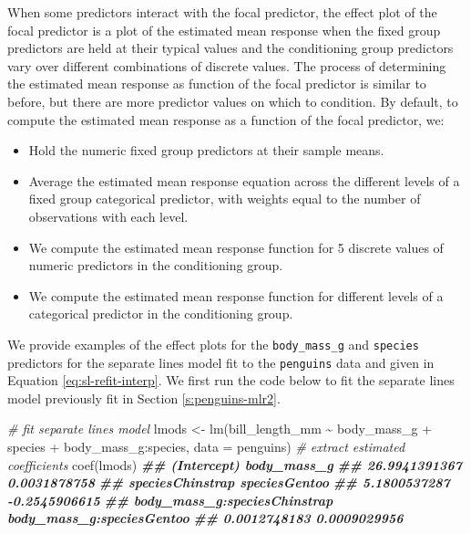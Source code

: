 \documentclass[
]{book}
\newenvironment{Shaded}{\begin{snugshade}}{\end{snugshade}}
\newcommand{\AttributeTok}[1]{\textcolor[rgb]{0.77,0.63,0.00}{#1}}
\newcommand{\CommentTok}[1]{\textcolor[rgb]{0.56,0.35,0.01}{\textit{#1}}}
\newcommand{\DocumentationTok}[1]{\textcolor[rgb]{0.56,0.35,0.01}{\textbf{\textit{#1}}}}
\newcommand{\FunctionTok}[1]{\textcolor[rgb]{0.00,0.00,0.00}{#1}}
\newcommand{\NormalTok}[1]{#1}
\newcommand{\OtherTok}[1]{\textcolor[rgb]{0.56,0.35,0.01}{#1}}
\newcommand{\SpecialCharTok}[1]{\textcolor[rgb]{0.00,0.00,0.00}{#1}}
\providecommand{\tightlist}{%
  \setlength{\itemsep}{0pt}\setlength{\parskip}{0pt}}
\theoremstyle{definition}
\theoremstyle{definition}
\theoremstyle{definition}
\theoremstyle{definition}
\theoremstyle{remark}
\begin{document}
When some predictors interact with the focal predictor, the effect plot
of the focal predictor is a plot of the estimated mean response when the
fixed group predictors are held at their typical values and the
conditioning group predictors vary over different combinations of
discrete values. The process of determining the estimated mean response
as function of the focal predictor is similar to before, but there are
more predictor values on which to condition. By default, to compute the
estimated mean response as a function of the focal predictor, we:

\begin{itemize}
\tightlist
\item
  Hold the numeric fixed group predictors at their sample means.
\item
  Average the estimated mean response equation across the different
  levels of a fixed group categorical predictor, with weights equal to
  the number of observations with each level.
\item
  We compute the estimated mean response function for 5 discrete
  values of numeric predictors in the conditioning group.
\item
  We compute the estimated mean response function for different levels
  of a categorical predictor in the conditioning group.
\end{itemize}

We provide examples of the effect plots for the \texttt{body\_mass\_g} and
\texttt{species} predictors for the separate lines model fit to the \texttt{penguins}
data and given in Equation \eqref{eq:sl-refit-interp}. We first run the
code below to fit the separate lines model previously fit in Section
\ref{s:penguins-mlr2}.

\begin{Shaded}
\begin{Highlighting}[]
\CommentTok{\# fit separate lines model}
\NormalTok{lmods }\OtherTok{\textless{}{-}} \FunctionTok{lm}\NormalTok{(bill\_length\_mm }\SpecialCharTok{\textasciitilde{}}\NormalTok{ body\_mass\_g }\SpecialCharTok{+}\NormalTok{ species }\SpecialCharTok{+}\NormalTok{ body\_mass\_g}\SpecialCharTok{:}\NormalTok{species,}
            \AttributeTok{data =}\NormalTok{ penguins)}
\CommentTok{\# extract estimated coefficients}
\FunctionTok{coef}\NormalTok{(lmods)}
\DocumentationTok{\#\#                  (Intercept)                  body\_mass\_g }
\DocumentationTok{\#\#                26.9941391367                 0.0031878758 }
\DocumentationTok{\#\#             speciesChinstrap                speciesGentoo }
\DocumentationTok{\#\#                 5.1800537287                {-}0.2545906615 }
\DocumentationTok{\#\# body\_mass\_g:speciesChinstrap    body\_mass\_g:speciesGentoo }
\DocumentationTok{\#\#                 0.0012748183                 0.0009029956}
\end{Highlighting}
\end{Shaded}
\end{document}
